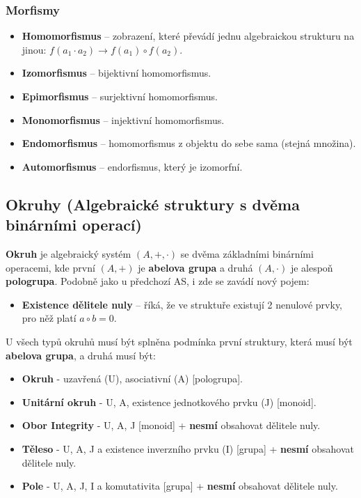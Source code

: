 \subsubsection{Morfismy}
\begin{itemize}
\item \textbf{Homomorfismus} -- zobrazení, které převádí jednu algebraickou strukturu na jinou: $f(a_1 \cdot a_2) \rightarrow f(a_1) \circ f(a_2)$.
\item \textbf{Izomorfismus} -- bijektivní homomorfismus.
\item \textbf{Epimorfismus} -- surjektivní homomorfismus.
\item \textbf{Monomorfismus} -- injektivní homomorfismus.
\item \textbf{Endomorfismus} -- homomorfismus z objektu do sebe sama (stejná množina).
\item \textbf{Automorfismus} -- endorfismus, který je izomorfní.
\end{itemize}

\subsection{Okruhy (Algebraické struktury s dvěma binárními operací)}
\textbf{Okruh} je algebraický systém $(A, +, \cdot)$ se dvěma základními binárními operacemi, kde první $(A, +)$ je \textbf{abelova grupa} a druhá $(A, \cdot)$ je alespoň \textbf{pologrupa}. Podobně jako u předchozí AS, i zde se zavádí nový pojem:
\begin{itemize}
\item \textbf{Existence dělitele nuly} -- říká, že ve struktuře existují 2 nenulové prvky, pro něž platí $a \circ b = 0$.
\end{itemize}
U všech typů okruhů musí být splněna podmínka první struktury, která musí být \textbf{abelova grupa}, a druhá musí být:
\begin{itemize}
\item \textbf{Okruh} - uzavřená ({U}), asociativní ({A}) [pologrupa].
\item \textbf{Unitární okruh} - {U}, {A}, existence jednotkového prvku (J) [monoid].
\item \textbf{Obor Integrity} - {U}, {A}, {J} [monoid] + \textbf{nesmí} obsahovat dělitele nuly.
\item \textbf{Těleso} - {U}, {A}, {J} a existence inverzního prvku (I) [grupa] + \textbf{nesmí} obsahovat dělitele nuly.
\item \textbf{Pole} - {U}, {A}, {J}, {I} a komutativita [grupa] + \textbf{nesmí} obsahovat dělitele nuly.
\end{itemize} 